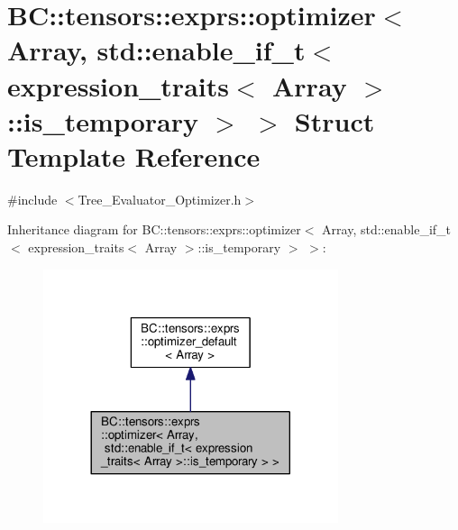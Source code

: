 \hypertarget{structBC_1_1tensors_1_1exprs_1_1optimizer_3_01Array_00_01std_1_1enable__if__t_3_01expression__tr68cef5038e1d1eb9ba9ce04475b4c24a}{}\section{BC\+:\+:tensors\+:\+:exprs\+:\+:optimizer$<$ Array, std\+:\+:enable\+\_\+if\+\_\+t$<$ expression\+\_\+traits$<$ Array $>$\+:\+:is\+\_\+temporary $>$ $>$ Struct Template Reference}
\label{structBC_1_1tensors_1_1exprs_1_1optimizer_3_01Array_00_01std_1_1enable__if__t_3_01expression__tr68cef5038e1d1eb9ba9ce04475b4c24a}


{\ttfamily \#include $<$Tree\+\_\+\+Evaluator\+\_\+\+Optimizer.\+h$>$}



Inheritance diagram for BC\+:\+:tensors\+:\+:exprs\+:\+:optimizer$<$ Array, std\+:\+:enable\+\_\+if\+\_\+t$<$ expression\+\_\+traits$<$ Array $>$\+:\+:is\+\_\+temporary $>$ $>$\+:
\nopagebreak
\begin{figure}[H]
\begin{center}
\leavevmode
\includegraphics[width=245pt]{structBC_1_1tensors_1_1exprs_1_1optimizer_3_01Array_00_01std_1_1enable__if__t_3_01expression__trb74186ee66b0ed1ca994dd0c6bea2b31}
\end{center}
\end{figure}


